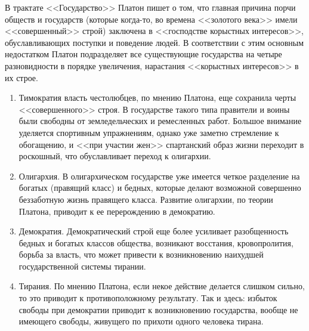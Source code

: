 	В трактате <<Государство>> Платон пишет о том, что главная причина порчи 
	обществ и государств (которые когда-то, во времена <<золотого века>> имели 
	<<совершенный>> строй) заключена в <<господстве корыстных интересов>>, 
	обуславливающих поступки и поведение людей. В соответствии с этим основным 
	недостатком Платон подразделяет все существующие государства на четыре 
	разновидности в порядке увеличения, нарастания <<корыстных интересов>> в 
	их строе. 

	\begin{enumerate}
		\item Тимократия власть честолюбцев, по мнению Платона, еще 
			сохранила черты <<совершенного>> строя. В государстве такого типа 
			правители и воины были свободны от земледельческих и ремесленных 
			работ. Большое внимание уделяется спортивным упражнениям, однако 
			уже заметно стремление к обогащению, и <<при участии жен>> 
			спартанский образ жизни переходит в роскошный, что обуславливает 
			переход к олигархии. 
		\item Олигархия. В олигархическом государстве уже имеется четкое 
			разделение на богатых (правящий класс) и бедных, которые делают 
			возможной совершенно беззаботную жизнь правящего класса. Развитие 
			олигархии, по теории Платона, приводит к ее перерождению в 
			демократию. 
		\item Демократия. Демократический строй еще более усиливает 
			разобщенность бедных и богатых классов общества, возникают 
			восстания, кровопролития, борьба за власть, что может привести к 
			возникновению наихудшей государственной системы тирании. 
		\item Тирания. По мнению Платона, если некое действие делается 
			слишком сильно, то это приводит к противоположному результату. 
			Так и здесь: избыток свободы при демократии приводит к 
			возникновению государства, вообще не имеющего свободы, живущего 
			по прихоти одного человека тирана.
	\end{enumerate}

